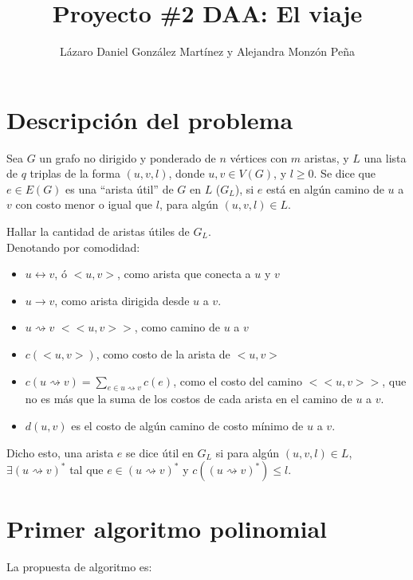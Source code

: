 \documentclass[a4paper]{article}
\begin{document}
    \title{\textbf{Proyecto \#2 DAA:} El viaje}
    \author{L\'azaro Daniel Gonz\'alez Mart\'inez y Alejandra Monz\'on Pe\~na}
    \date{}
    \maketitle

    \section*{Descripci\'on del problema}
    Sea $G$ un grafo no dirigido y ponderado de $n$ vértices con $m$ aristas, y $L$ una lista de $q$ triplas de la forma $(u,v,l)$, donde $u,v\in V(G)$, y $l \ge 0$. Se dice que $e \in E(G)$ es una ``arista útil'' de $G$ en $L$ ($G_L$), si $e$ está en algún camino de $u$ a $v$ con costo menor o igual que $l$, para algún $(u,v,l)\in L$.
    
    Hallar la cantidad de aristas útiles de $G_L$.\\
    
    Denotando por comodidad:
    \begin{itemize}
    	\item $u \leftrightarrow v$, ó $<u,v>$, como arista que conecta a $u$ y $v$
    	\item $u \rightarrow v$, como arista dirigida desde $u$ a $v$.
    	\item $u \rightsquigarrow v$ $<<u, v>>$, como camino de $u$ a $v$
    	\item $c(<u,v>)$, como costo de la arista de $<u,v>$
    	\item $c(u \rightsquigarrow v) = \sum_{e\in u \rightsquigarrow v}^{}c(e)$, como el costo del camino $<<u,v>>$, que no es más que la suma de los costos de cada arista en el camino de $u$ a $v$.
    	\item $d(u,v)$ es el costo de algún camino de costo mínimo de $u$ a $v$.
    \end{itemize}
	
	Dicho esto, una arista $e$ se dice útil en $G_L$ si para algún $(u,v,l) \in L$, $\exists (u\rightsquigarrow v)^*$ tal que $e \in (u\rightsquigarrow v)^*$ y $c((u\rightsquigarrow v)^*) \le l$.
    
    
    \section*{Primer algoritmo polinomial}
    
    La propuesta de algoritmo es:
    
\end{document}
